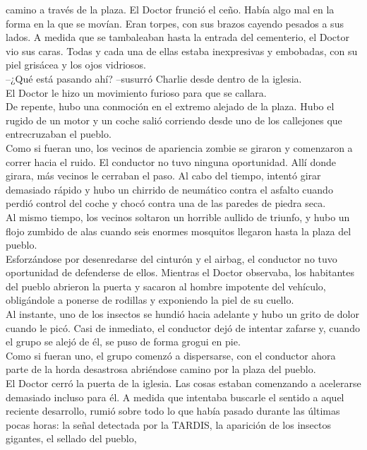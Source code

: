 camino a través de la plaza. El Doctor frunció el ceño. Había algo mal
en la forma en la que se movían. Eran torpes, con sus brazos cayendo
pesados a sus lados. A medida que se tambaleaban hasta la entrada del
cementerio, el Doctor vio sus caras. Todas y cada una de ellas estaba
inexpresivas y embobadas, con su piel grisácea y los ojos vidriosos.\\
--¿Qué está pasando ahí? --susurró Charlie desde dentro de la iglesia.\\
El Doctor le hizo un movimiento furioso para que se callara.\\
De repente, hubo una conmoción en el extremo alejado de la plaza. Hubo
el rugido de un motor y un coche salió corriendo desde uno de los
callejones que entrecruzaban el pueblo.\\
Como si fueran uno, los vecinos de apariencia zombie se giraron y
comenzaron a correr hacia el ruido. El conductor no tuvo ninguna
oportunidad. Allí donde girara, más vecinos le cerraban el paso. Al cabo
del tiempo, intentó girar demasiado rápido y hubo un chirrido de
neumático contra el asfalto cuando perdió control del coche y chocó
contra una de las paredes de piedra seca.\\
Al mismo tiempo, los vecinos soltaron un horrible aullido de triunfo, y
hubo un flojo zumbido de alas cuando seis enormes mosquitos llegaron
hasta la plaza del pueblo.\\
Esforzándose por desenredarse del cinturón y el airbag, el conductor no
tuvo oportunidad de defenderse de ellos. Mientras el Doctor observaba,
los habitantes del pueblo abrieron la puerta y sacaron al hombre
impotente del vehículo, obligándole a ponerse de rodillas y exponiendo
la piel de su cuello.\\
Al instante, uno de los insectos se hundió hacia adelante y hubo un
grito de dolor cuando le picó. Casi de inmediato, el conductor dejó de
intentar zafarse y, cuando el grupo se alejó de él, se puso de forma
grogui en pie.\\
Como si fueran uno, el grupo comenzó a dispersarse, con el conductor
ahora parte de la horda desastrosa abriéndose camino por la plaza del
pueblo.\\
El Doctor cerró la puerta de la iglesia. Las cosas estaban comenzando a
acelerarse demasiado incluso para él. A medida que intentaba buscarle el
sentido a aquel reciente desarrollo, rumió sobre todo lo que había
pasado durante las últimas pocas horas: la señal detectada por la
TARDIS, la aparición de los insectos gigantes, el sellado del pueblo,
